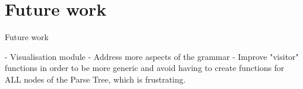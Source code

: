 \chapter{Future work}

\vspace{0.5cm}

Future work

- Visualisation module
- Address more aspects of the grammar
- Improve "visitor" functions in order to be more generic and avoid having to
create functions for ALL nodes of the Parse Tree, which is frustrating.